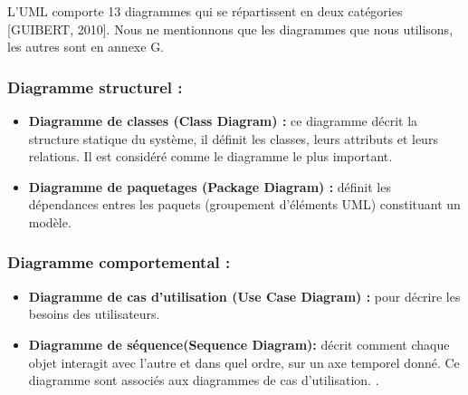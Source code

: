  L’UML comporte 13 diagrammes qui se répartissent en deux catégories [GUIBERT, 2010]. Nous ne mentionnons que les diagrammes que nous utilisons, les autres sont en annexe G. 
 
 \subsubsection{Diagramme structurel : }
 \begin{itemize}
 \item \textbf{Diagramme de classes (Class Diagram) : }ce diagramme décrit la structure statique du système, il définit les classes, leurs attributs et leurs relations. Il est considéré comme le diagramme le plus important.
  \item  \textbf{Diagramme de paquetages (Package Diagram) : }définit les dépendances entres les paquets (groupement d’éléments UML) constituant un modèle. 
 \end{itemize}
 
 
  \subsubsection{Diagramme comportemental  : }
 
  \begin{itemize}
 	\item \textbf{Diagramme de cas d’utilisation (Use Case Diagram) : } pour décrire les besoins des utilisateurs. 
 	\item  \textbf{Diagramme de séquence(Sequence Diagram):}  décrit comment chaque objet interagit avec l’autre et dans quel ordre, sur un axe temporel donné. Ce diagramme sont associés aux diagrammes de cas d’utilisation.
 	. 
 \end{itemize}




